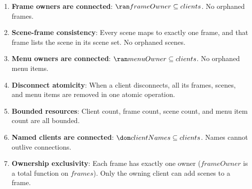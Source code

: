 \documentclass[a4paper,10pt,fleqn]{article}
\begin{document}
\begin{enumerate}
  \item \textbf{Frame owners are connected}: $\ran frameOwner
    \subseteq clients$.  No orphaned frames.

  \item \textbf{Scene-frame consistency}: Every scene maps to
    exactly one frame, and that frame lists the scene in its
    scene set.  No orphaned scenes.

  \item \textbf{Menu owners are connected}: $\ran menuOwner
    \subseteq clients$.  No orphaned menu items.

  \item \textbf{Disconnect atomicity}: When a client disconnects,
    all its frames, scenes, and menu items are removed in
    one atomic operation.

  \item \textbf{Bounded resources}: Client count, frame count,
    scene count, and menu item count are all bounded.

  \item \textbf{Named clients are connected}: $\dom clientNames
    \subseteq clients$.  Names cannot outlive connections.

  \item \textbf{Ownership exclusivity}: Each frame has exactly one
    owner ($frameOwner$ is a total function on $frames$).
    Only the owning client can add scenes to a frame.
\end{enumerate}
\end{document}

